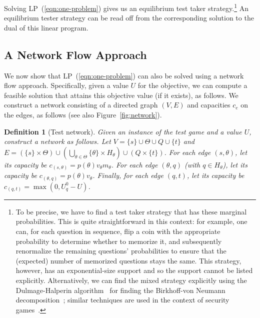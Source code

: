 \documentclass{article}
\newtheorem{definition}{Definition}
\begin{document}
Solving LP~(\ref{eqn:one-problem}) 
gives us an equilibrium test taker strategy.\footnote{To be precise, we have to
find a test taker strategy that has these marginal probabilities.
This is quite straightforward in this context: for example, one can, for
each question in sequence, flip a coin with the appropriate probability to
determine whether to memorize it, and subsequently renormalize the remaining
questions' probabilities to ensure that the (expected) number of memorized
questions stays the same.  This strategy, however, has an
exponential-size support and so the support cannot be listed explicitly.
Alternatively, we can find the mixed strategy
explicitly using the Dulmage-Halperin
algorithm~\cite{Dulmage55:Frobenius,Chang01:Birkhoff} for finding the
Birkhoff-von Neumann decomposition~\cite{Birkhoff46:Tres}; similar
techniques are used in the context of security
games~\cite{Korzhyk10:Complexity}.}
An equilibrium tester strategy can be read off from the corresponding
solution to the dual of this linear program. 

\subsection{A Network Flow Approach}

We now show that LP~(\ref{eqn:one-problem}) can also be solved using a
network flow approach.
Specifically, given a value $U$ for the objective, we can compute a
feasible solution that attains this objective value (if it exists), as
follows.  We construct a network consisting of a directed graph $(V, E)$
and capacities $c_e$ on the edges, as follows (see also
Figure~\ref{fig:network}). 

\begin{definition}[Test network]\label{def:network}
Given an instance of the  test game and a value $U$, construct a network as follows.
Let $V = \{s\} \cup \Theta \cup Q \cup \{t\}$
and 
$E = (\{s\} \times \Theta) \cup (\bigcup_{\theta \in \Theta} \{\theta\} \times
H_\theta) \cup (Q \times \{t\})$.
For each edge $(s, \theta)$, let its capacity be $c_{(s,
\theta)} = p(\theta) v_\theta m_\theta$. For each edge $(\theta, q)$ (with
$q \in H_\theta$), let its
capacity be $c_{(\theta, q)} = p(\theta) v_\theta$.
Finally, for each edge $(q, t)$, let its capacity be $c_{(q, t)} = \max(0,
U_q^0-U)$.
\end{definition}
\end{document}
